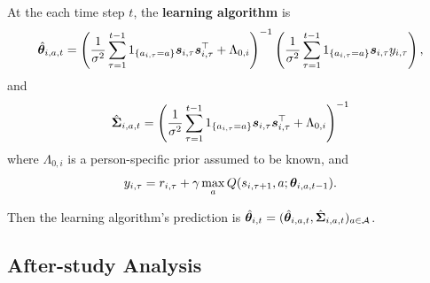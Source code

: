 \documentclass{article}
\newcommand{\sam}[1]{
  {\color{blue} [SAM: {#1}]}
 }
\def\post{{\texttt{post}}}
\begin{document}
At the each time step $t$, the \textbf{learning algorithm} is 
\begin{equation}
    \hat {{\bm{\theta}}}_{i, a, t} = \left(\frac{1}{\sigma^2}\sum_{\tau = 1}^{t-1}1_{\{a_{i, \tau} = a\}}{\bm{s}}_{i, \tau} {\bm{s}}_{i, \tau}^{\top} + \Lambda_{0, i}\right)^{-1}\left(\frac{1}{\sigma^2} \sum_{\tau = 1}^{t-1} 1_{\{a_{i, \tau} = a\}} {\bm{s}}_{i, \tau} y_{i,\tau} \right), \label{equ:mu_iat}
\end{equation}
and 
\begin{equation}
    \hat {{\bm{\Sigma}}}_{i, a, t} = \left(\frac{1}{\sigma^2}\sum_{\tau = 1}^{t-1}1_{\{a_{i, \tau} = a\}}{\bm{s}}_{i, \tau} {\bm{s}}_{i, \tau}^{\top} + \Lambda_{0, i}\right)^{-1} \label{equ:sigma_iat}
\end{equation}
where $\Lambda_{0, i}$ is a person-specific prior assumed to be known, and 
\[
    y_{i, \tau} = r_{i, \tau} + \gamma \max_a Q(s_{i, \tau+1}, a; {\bm{\theta}}_{i, a, t-1}).
\]

Then the learning algorithm's prediction is $\hat {{\bm{\theta}}}_{i, t} = (\hat {{\bm{\theta}}}_{i, a, t}, \hat {{\bm{\Sigma}}}_{i, a, t})_{a \in {\mathcal{A}}}$. 


\subsection{After-study Analysis}




\end{document}
